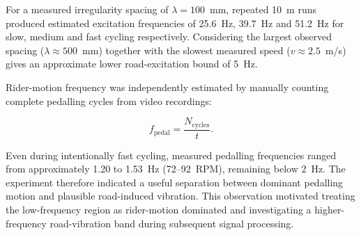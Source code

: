 For a measured irregularity spacing of $\lambda=100$~mm, repeated 10~m runs
produced estimated excitation frequencies of 25.6~Hz, 39.7~Hz and 51.2~Hz
for slow, medium and fast cycling respectively. Considering the largest
observed spacing ($\lambda\approx500$~mm) together with the slowest measured
speed ($v\approx2.5$~m/s) gives an approximate lower road-excitation bound of
5~Hz.

Rider-motion frequency was independently estimated by manually counting
complete pedalling cycles from video recordings:

\begin{equation}
    f_{\mathrm{pedal}}=\frac{N_{\mathrm{cycles}}}{t}.
\end{equation}

Even during intentionally fast cycling, measured pedalling frequencies ranged
from approximately 1.20 to 1.53~Hz (72--92~RPM), remaining below 2~Hz.
The experiment therefore indicated a useful separation between dominant
pedalling motion and plausible road-induced vibration. This observation
motivated treating the low-frequency region as rider-motion dominated and
investigating a higher-frequency road-vibration band during subsequent
signal processing.